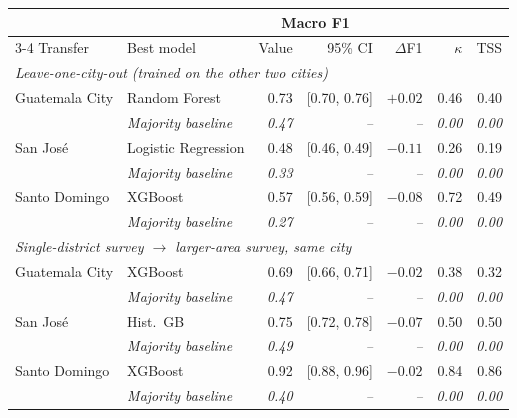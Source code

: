 \begin{tabular}{llrrrrr}
\toprule
 & & \multicolumn{2}{c}{Macro F1} & & & \\
\cmidrule(lr){3-4}
Transfer & Best model & Value & 95\% CI & $\Delta$F1 & $\kappa$ & TSS \\
\midrule
\multicolumn{7}{l}{\textit{Leave-one-city-out (trained on the other two cities)}} \\
Guatemala City & Random Forest & 0.73 & [0.70, 0.76] & $+0.02$ & 0.46 & 0.40 \\
 & \emph{Majority baseline} & \emph{0.47} & \emph{--} & \emph{--} & \emph{0.00} & \emph{0.00} \\
San Jos\'e & Logistic Regression & 0.48 & [0.46, 0.49] & $-0.11$ & 0.26 & 0.19 \\
 & \emph{Majority baseline} & \emph{0.33} & \emph{--} & \emph{--} & \emph{0.00} & \emph{0.00} \\
Santo Domingo & XGBoost & 0.57 & [0.56, 0.59] & $-0.08$ & 0.72 & 0.49 \\
 & \emph{Majority baseline} & \emph{0.27} & \emph{--} & \emph{--} & \emph{0.00} & \emph{0.00} \\
\midrule
\multicolumn{7}{l}{\textit{Single-district survey $\to$ larger-area survey, same city}} \\
Guatemala City & XGBoost & 0.69 & [0.66, 0.71] & $-0.02$ & 0.38 & 0.32 \\
 & \emph{Majority baseline} & \emph{0.47} & \emph{--} & \emph{--} & \emph{0.00} & \emph{0.00} \\
San Jos\'e & Hist.\ GB & 0.75 & [0.72, 0.78] & $-0.07$ & 0.50 & 0.50 \\
 & \emph{Majority baseline} & \emph{0.49} & \emph{--} & \emph{--} & \emph{0.00} & \emph{0.00} \\
Santo Domingo & XGBoost & 0.92 & [0.88, 0.96] & $-0.02$ & 0.84 & 0.86 \\
 & \emph{Majority baseline} & \emph{0.40} & \emph{--} & \emph{--} & \emph{0.00} & \emph{0.00} \\
\bottomrule
\end{tabular}
